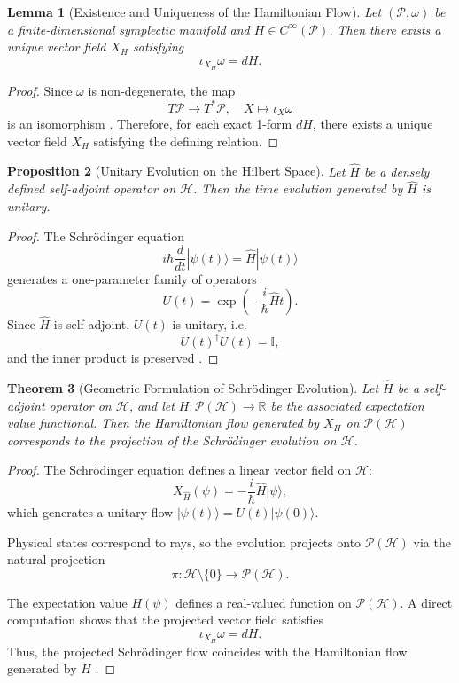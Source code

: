 \documentclass[11pt, a4paper]{article}
\newtheorem{theorem}{Theorem}[section]
\newtheorem{lemma}[theorem]{Lemma}
\newtheorem{proposition}[theorem]{Proposition}
\begin{document}
\begin{lemma}[Existence and Uniqueness of the Hamiltonian Flow]
Let $(\mathcal{P}, \omega)$ be a finite-dimensional symplectic manifold
and $H \in C^\infty(\mathcal{P})$. Then there exists a unique vector field
$X_H$ satisfying
\[
\iota_{X_H} \omega = dH.
\]
\end{lemma}

\begin{proof}
Since $\omega$ is non-degenerate, the map
\[
T\mathcal{P} \to T^*\mathcal{P}, \quad X \mapsto \iota_X \omega
\]
is an isomorphism \cite{arnold1989}. Therefore, for each exact 1-form $dH$,
there exists a unique vector field $X_H$ satisfying the defining relation.
\end{proof}

\begin{proposition}[Unitary Evolution on the Hilbert Space]
Let $\hat{H}$ be a densely defined self-adjoint operator on $\mathcal{H}$.
Then the time evolution generated by $\hat{H}$ is unitary.
\end{proposition}

\begin{proof}
The Schr\"odinger equation
\[
i\hbar \frac{d}{dt} |\psi(t)\rangle = \hat{H} |\psi(t)\rangle
\]
generates a one-parameter family of operators
\[
U(t) = \exp\left(-\frac{i}{\hbar}\hat{H}t\right).
\]
Since $\hat{H}$ is self-adjoint, $U(t)$ is unitary, i.e.
\[
U(t)^\dagger U(t) = \mathbb{I},
\]
and the inner product is preserved \cite{dirac1958}.
\end{proof}

\begin{theorem}[Geometric Formulation of Schr\"odinger Evolution]
Let $\hat{H}$ be a self-adjoint operator on $\mathcal{H}$, and let
$H: \mathcal{P}(\mathcal{H}) \to \mathbb{R}$ be the associated expectation
value functional. Then the Hamiltonian flow generated by $X_H$ on
$\mathcal{P}(\mathcal{H})$ corresponds to the projection of the Schr\"odinger
evolution on $\mathcal{H}$.
\end{theorem}

\begin{proof}
The Schr\"odinger equation defines a linear vector field on $\mathcal{H}$:
\[
X_{\hat{H}}(\psi) = -\frac{i}{\hbar}\hat{H}|\psi\rangle,
\]
which generates a unitary flow $|\psi(t)\rangle = U(t)|\psi(0)\rangle$.

Physical states correspond to rays, so the evolution projects onto
$\mathcal{P}(\mathcal{H})$ via the natural projection
\[
\pi: \mathcal{H} \setminus \{0\} \to \mathcal{P}(\mathcal{H}).
\]

The expectation value $H(\psi)$ defines a real-valued function on
$\mathcal{P}(\mathcal{H})$. A direct computation shows that the projected
vector field satisfies
\[
\iota_{X_H} \omega = dH.
\]
Thus, the projected Schr\"odinger flow coincides with the Hamiltonian flow
generated by $H$ \cite{kibble1979,anandan1990}.
\end{proof}
\end{document}
